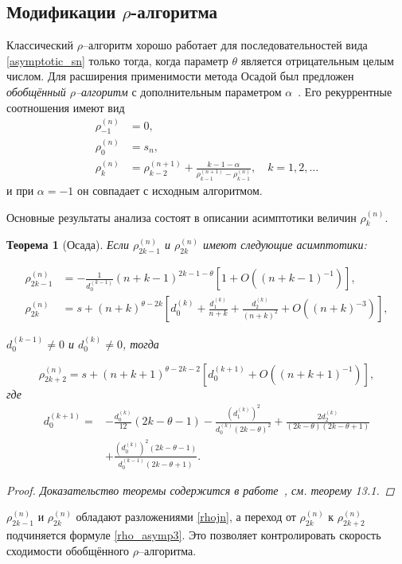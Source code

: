 \documentclass[14pt, a4paper]{extarticle}
\newtheorem{theorem}{Теорема}[section] %
\theoremstyle{definition}
\theoremstyle{remark}
\begin{document}
\subsection*{Модификации $\rho$-алгоритма}

Классический $\rho$--алгоритм хорошо работает для последовательностей вида
\eqref{asymptotic_sn} только тогда, когда параметр $\theta$ является отрицательным целым числом. 
Для расширения применимости метода Осадой был предложен \emph{обобщённый $\rho$--алгоритм} с дополнительным параметром $\alpha$~\cite{osada1990}. 
Его рекуррентные соотношения имеют вид
\begin{align}
\rho_{-1}^{(n)} & = 0, \label{eq:rho_gen_a}\\
\rho_{0}^{(n)} & = s_n, \label{eq:rho_gen_b}\\
\rho_{k}^{(n)} & = \rho_{k-2}^{(n+1)} + \frac{k-1-\alpha}{\rho_{k-1}^{(n+1)} - \rho_{k-1}^{(n)}}, 
\quad k=1,2,\dots \label{eq:rho_gen_c}
\end{align}
и при $\alpha = -1$ он совпадает с исходным алгоритмом.

Основные результаты анализа состоят в описании асимптотики величин $\rho_k^{(n)}$. 
\begin{theorem}[Осада]
Если $\rho_{2 k-1}^{(n)}$ и $\rho_{2 k}^{(n)}$ имеют следующие асимптотики:


\begin{align*}
\rho_{2 k-1}^{(n)} & =-\frac{1}{d_{0}^{(k-1)}}(n+k-1)^{2 k-1-\theta}\left[1+O\left((n+k-1)^{-1}\right)\right], \\
\rho_{2 k}^{(n)} & =s+(n+k)^{\theta-2 k}\left[d_{0}^{(k)}+\frac{d_{1}^{(k)}}{n+k}+\frac{d_{2}^{(k)}}{(n+k)^{2}}+O\left((n+k)^{-3}\right)\right] ,
\end{align*}


$d_{0}^{(k-1)} \neq 0$ и $d_{0}^{(k)} \neq 0$, тогда


\begin{equation*}
\rho_{2 k+2}^{(n)}=s+(n+k+1)^{\theta-2 k-2}\left[d_{0}^{(k+1)}+O\left((n+k+1)^{-1}\right)\right],
\end{equation*}
где
\begin{align*}
d_{0}^{(k+1)}= & -\frac{d_{0}^{(k)}}{12}(2 k-\theta-1)-\frac{\left(d_{1}^{(k)}\right)^{2}}{d_{0}^{(k)}(2 k-\theta)^{2}}+\frac{2 d_{2}^{(k)}}{(2 k-\theta)(2 k-\theta+1)} \\
& +\frac{\left(d_{0}^{(k)}\right)^{2}(2 k-\theta-1)}{d_{0}^{(k-1)}(2 k-\theta+1)}.
\end{align*}

\begin{proof}
Доказательство теоремы содержится в работе~\cite{Osada1993}, см. теорему 13.1.
\end{proof}


\end{theorem}$\rho_{2k-1}^{(n)}$ и $\rho_{2k}^{(n)}$ обладают разложениями \eqref{rhojn}, а 
переход от $\rho_{2k}^{(n)}$ к $\rho_{2k+2}^{(n)}$ подчиняется формуле \eqref{rho_asymp3}. 
Это позволяет контролировать скорость сходимости обобщённого $\rho$--алгоритма.
\end{document}

